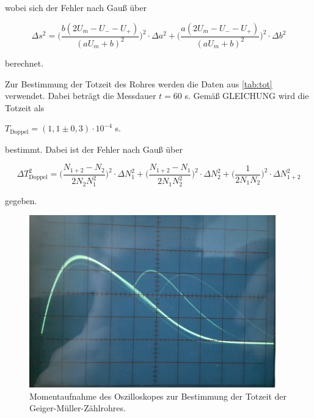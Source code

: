 wobei sich der Fehler nach Gauß über

\begin{equation}
    \Delta s^2 = \bigg( \dfrac{b\left(2 U_m - U_- -U_+ \right)}{\left(a U_m + b \right)^2} \bigg)^2 \cdot \Delta a^2 + \bigg( \dfrac{a\left(2U_m - U_- - U_+ \right)}{\left(a U_m + b \right)^2} \bigg)^2 \cdot \Delta b^2
\end{equation}

berechnet.




Zur Bestimmung der Totzeit des Rohres werden die Daten aus \autoref{tab:tot} verwendet.
Dabei beträgt die Messdauer $t = 60$ s.
Gemäß GLEICHUNG wird die Totzeit als

\begin{center}
    $T_\text{Doppel} = (1,1 \pm 0,3) \cdot 10^{-4}$ s.
\end{center}

bestimmt. Dabei ist der Fehler nach Gauß über

\begin{equation}
    \Delta T_\text{Doppel}^2 = \bigg( \dfrac{N_{1+2} - N_2}{2 N_2 N_1^2} \bigg)^2 \cdot \Delta N_1^2 + \bigg( \dfrac{N_{1+2} - N_1}{2 N_1 N_2^2}  \bigg)^2 \cdot \Delta N_2^2 + \bigg( \dfrac{1}{2 N_1 N_2} \bigg)^2 \cdot \Delta N_{1+2}^2
\end{equation}

gegeben.

\begin{figure}
  \centering
  \includegraphics[width=0.95\textwidth]{content/osz.png}
  \caption{Momentaufnahme des Oszilloskopes zur Bestimmung der Totzeit der Geiger-Müller-Zählrohres.}
  \label{fig:osz}
\end{figure}

